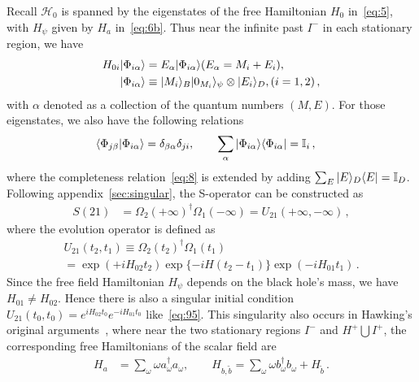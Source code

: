 \documentclass[12pt,a4paper]{article}
\begin{document}
Recall $\mathcal {H}_0$ is spanned by the eigenstates of the free
Hamiltonian $H_0$ in~\eqref{eq:5}, with $H_{\psi}$ given by $H_{a}$ in~\eqref{eq:6b}. Thus near the infinite past $I^-$ in each stationary region, we have
\begin{align}
\label{eq:28}
H_{0i}\arrowvert\Phi_{i\alpha}\rangle &=
E_{\alpha}\arrowvert\Phi_{i\alpha}\rangle(E_{\alpha}=M_{i}+E_{i}),\nonumber\\
\arrowvert\Phi_{i\alpha}\rangle&\equiv\arrowvert
M_{i}\rangle_{B}\arrowvert0_{M_{i}}\rangle_{\psi}\otimes\arrowvert
E_{i}\rangle_D,(i=1,2) \,,
\end{align}
with $\alpha$ denoted as a collection of the quantum
numbers $(M,E)$. For those eigenstates, we also have the following relations
\begin{equation}
\label{eq:29}
\begin{split}
\langle\Phi_{j\beta}\arrowvert\Phi_{i\alpha}\rangle &=
\delta_{\beta\alpha}\delta_{ji},\qquad\sum_{\alpha}\arrowvert\Phi_{i\alpha}\rangle\langle\Phi_{i\alpha}\arrowvert=\mathbb{I}_i
\,,
\end{split}
\end{equation}
where the completeness relation~\eqref{eq:8} is extended by adding $\sum_{E}\arrowvert E\rangle_D\langle
E\arrowvert=\mathbb{I}_D$. Following appendix~\ref{sec:singular}, the S-operator can be constructed as
\begin{equation}
\label{eq:30}
\begin{split}
S(21) &= \Omega_2(+\infty)^{\dag}\Omega_1(-\infty) =
U_{21}(+\infty,-\infty) \,,
\end{split}
\end{equation}
where the evolution operator is defined as
\begin{multline}
\label{eq:31}
U_{21}(t_2,t_1)\equiv \Omega_2(t_2)^{\dag}\Omega_1(t_1) \\
=\exp(+iH_{02}t_2)\exp\{-i H(t_2-t_1)\}\exp(-i H_{01}t_1) \,.
\end{multline}
Since the free field
Hamiltonian $H_{\psi}$ depends on the black hole's mass, we have $H_{01}\neq H_{02}$. Hence there is also a
singular initial condition $U_{21}(t_0,t_0)=e^{iH_{02}t_0}e^{-iH_{01}t_0}$ like~\eqref{eq:95}.
This singularity also occurs in Hawking's original arguments~\cite{a,b}, where near the two
stationary regions $I^-$ and $H^+\bigcup I^+$, the corresponding free Hamiltonians of the scalar field are
\begin{equation}
\label{eq:32}
\begin{split}
H_{a} &= \sum_{\omega}\omega a_{\omega}^{\dag}a_{\omega},\qquad
H_{b,\tilde{b}}=\sum_{\omega}\omega
b_{\omega}^{\dag}b_{\omega}+H_{\tilde{b}}\,.
\end{split}
\end{equation}
\end{document}
